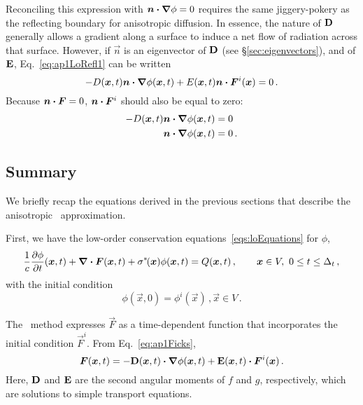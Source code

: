 Reconciling this expression with $\bm{n} \bm{\cdot} \bm{\nabla} \phi=0$ requires the same
jiggery-pokery as the reflecting boundary for anisotropic diffusion. In essence,
the nature of $\mathbf{D}$ generally allows a gradient along a surface to induce a
net flow of radiation across that surface. However, if $\vec{n}$ is an
eigenvector of $\mathbf{D}$ (see \S\ref{sec:eigenvectors}), and of $\mathbf{E}$,
Eq.~\eqref{eq:ap1LoRefl1} can be written
\begin{equation*}
  - D(\bm{x},t) \bm{n} \bm{\cdot} \bm{\nabla} \phi(\bm{x},t)
  + E(\bm{x},t) \bm{n} \bm{\cdot} \bm{F}^i(\bm{x}) = 0\,.
\end{equation*}
Because $\bm{n}\bm{\cdot}\bm{F}=0$, $\bm{n}\bm{\cdot}\bm{F}^i$ should also be equal to
zero:
\begin{align}\nonumber
  - D(\bm{x},t) \bm{n} \bm{\cdot} \bm{\nabla} \phi(\bm{x},t) &= 0  
  \\ \label{eq:ap1LoRefl2}
  \bm{n} \bm{\cdot} \bm{\nabla} \phi(\bm{x},t) &= 0\,.
\end{align}

\subsection{Summary}
We briefly recap the equations derived in the previous sections that describe
the anisotropic \Pone\ approximation.

First, we have the low-order conservation equations~\eqref{eqs:loEquations} for
$\phi$,
\begin{equation*}
  \frac{1}{c} \frac{\partial \phi}{\partial t} (\bm{x}, t)
  + \bm{\nabla} \bm{\cdot} \bm{F}(\bm{x},t)
  + \sigma^{*\!}(\bm{x}) \phi(\bm{x}, t)
  = Q(\bm{x}, t) \,,
  \qquad \bm{x} \in V,\ 0 \le t \le \Delta_t \,,
\end{equation*}
with the initial condition
\begin{equation*}
\phi(\vec{x}, 0) = \phi^i(\vec{x})\,, \vec{x} \in V  \,.
\end{equation*}

The \APone\ method expresses $\vec{F}$ as a time-dependent function that
incorporates the initial condition $\vec{F}^i$. From Eq.~\eqref{eq:ap1Ficks},
\begin{equation*}
  \bm{F}(\bm{x}, t)
= - \mathbf{D}(\bm{x},t) \bm{\cdot} \bm{\nabla} \phi(\bm{x},t)
  + \mathbf{E}(\bm{x},t) \bm{\cdot} \bm{F}^i(\bm{x})\,.
\end{equation*}
Here, $\mathbf{D}$ and $\mathbf{E}$ are the second angular moments of $f$ and $g$,
respectively, which are solutions to simple transport equations.

